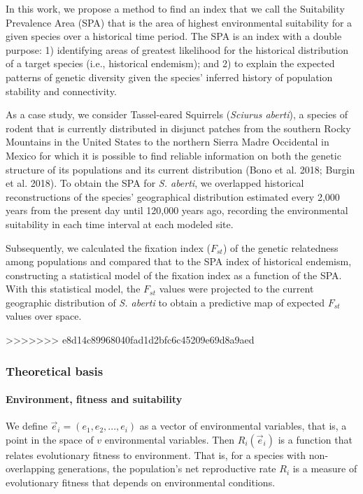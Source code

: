 \documentclass[
]{article}
\begin{document}
In this work, we propose a method to find an index that we call the Suitability Prevalence Area
(SPA) that is the area of highest environmental suitability for a given species over a historical time period. The SPA is an index with a double purpose: 1) identifying areas of greatest likelihood for the historical distribution of a target species (i.e., historical endemism); and 2) to explain the expected patterns of genetic diversity given the species' inferred history of population stability and connectivity. 

As a case study, we consider Tassel-eared Squirrels (\emph{Sciurus aberti}), a species of rodent that is currently distributed in disjunct patches from the southern Rocky Mountains in the United States to the northern Sierra Madre Occidental in Mexico for which it is possible to find reliable information on both the genetic structure of its populations and its current distribution (Bono et al. 2018; Burgin et al. 2018). To obtain the SPA for \textit{S. aberti}, we overlapped historical reconstructions of the species' geographical distribution estimated every 2,000 years from the present day until 120,000 years ago, recording the environmental suitability in each time interval at each modeled site.

Subsequently, we calculated the fixation index (\(F_{st}\)) of the genetic relatedness among populations and compared that to the SPA index of historical endemism, constructing a statistical model of the fixation index as a function of the SPA. With this statistical model, the \(F_{st}\) values were projected to the current geographic distribution of \textit{S. aberti} to obtain a predictive map of expected \(F_{st}\) values over space.

>>>>>>> e8d14c89968040fad1d2bfc6c45209e69d8a9aed

\hypertarget{theoretical-basis}{%
\subsubsection{Theoretical basis}\label{theoretical-basis}}

\hypertarget{environment-fitness-and-suitability}{%
\paragraph{Environment, fitness and
suitability}\label{environment-fitness-and-suitability}}

We define \(\vec{e}_i =(e_1, e_2, ..., e_i )\) as a vector of
environmental variables, that is, a point in the space of \(v\)
environmental variables. Then \(R_i(\vec{e}_i)\) is a function that
relates evolutionary fitness to environment. That is, for a species with
non-overlapping generations, the population's net reproductive rate 
\(R_i\) is a measure of evolutionary fitness that depends on
environmental conditions.
\end{document}
